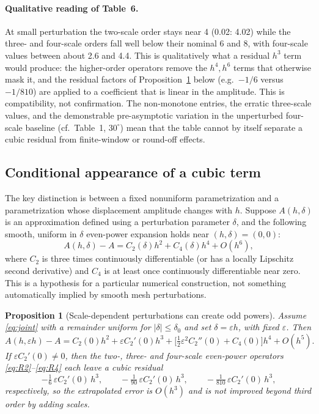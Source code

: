 \documentclass[11pt]{article}
\newtheorem{proposition}{Proposition}
\theoremstyle{remark}
\begin{document}
\paragraph{Qualitative reading of Table~6.}
At small perturbation the two-scale order stays near 4 (0.02: 4.02) while the three- and
four-scale orders fall well below their nominal 6 and 8, with four-scale values between about
2.6 and 4.4. This is qualitatively what a residual $h^3$ term would produce: the higher-order
operators remove the $h^4,h^6$ terms that otherwise mask it, and the residual factors of
Proposition~\ref{prop:cubic} below (e.g.\ $-1/6$ versus $-1/810$) are applied to a coefficient that is linear
in the amplitude. This is compatibility, not confirmation. The non-monotone entries, the
erratic three-scale values, and the demonstrable pre-asymptotic variation in the unperturbed
four-scale baseline (cf.\ Table~1, $30^\circ$) mean that the table cannot by itself separate a
cubic residual from finite-window or round-off effects.


\subsection{Conditional appearance of a cubic term}
The key distinction is between a fixed nonuniform parametrization and a parametrization whose
displacement amplitude changes with $h$. Suppose $A(h,\delta)$ is an approximation defined
using a perturbation parameter $\delta$, and the following smooth, uniform in $\delta$
even-power expansion holds near $(h,\delta)=(0,0)$:
\begin{equation}\label{eq:joint}
A(h,\delta)-A=C_2(\delta)h^2+C_4(\delta)h^4+O(h^6),
\end{equation}
where $C_2$ is three times continuously differentiable (or has a locally Lipschitz second
derivative) and $C_4$ is at least once continuously differentiable near zero. This is a
hypothesis for a particular numerical construction, not something automatically implied by
smooth mesh perturbations.

\begin{proposition}[Scale-dependent perturbations can create odd powers]\label{prop:cubic}
Assume \eqref{eq:joint} with a remainder uniform for $|\delta|\le\delta_0$ and set
$\delta=\varepsilon h$, with fixed $\varepsilon$. Then
\begin{equation}\label{eq:cubic}
A(h,\varepsilon h)-A=C_2(0)h^2+\varepsilon C_2'(0)h^3
+\Big[\tfrac12\varepsilon^2C_2''(0)+C_4(0)\Big]h^4+O(h^5).
\end{equation}
If $\varepsilon C_2'(0)\neq0$, then the two-, three- and four-scale even-power operators
\eqref{eq:R2}--\eqref{eq:R4} each leave a cubic residual
\[
-\tfrac16\,\varepsilon C_2'(0)\,h^3,\qquad
-\tfrac1{90}\,\varepsilon C_2'(0)\,h^3,\qquad
-\tfrac1{810}\,\varepsilon C_2'(0)\,h^3,
\]
respectively, so the extrapolated error is $O(h^3)$ and is not improved beyond third order by
adding scales.
\end{proposition}
\end{document}
